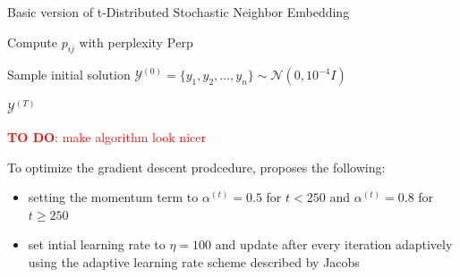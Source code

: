 \begin{algorithm}[H]
    \caption{Basic version of t-Distributed Stochastic Neighbor Embedding}
    \label{alg:tsne}


    Compute $p_{ij}$ with perplexity $\text{Perp}$ 
    
    Sample initial solution $\mathcal{Y}^{(0)} = \{y_1, y_2, \dots, y_n\} \sim \mathcal{N}(0, 10^{-4} I)$\


    \Return $\mathcal{Y}^{(T)}$\
\end{algorithm}
\textcolor{red}{\textbf{TO DO}: make algorithm look nicer}

To optimize the gradient descent prodcedure, \cite{vdMaa08} proposes the following: 
\begin{itemize}
    \item setting the momentum term to $\alpha^{(t)} = 0.5$ for $t<250$ and $\alpha^{(t)} = 0.8$ for $t \geq 250$
    \item set intial learning rate to $\eta = 100$ and update after every iteration adaptively using the adaptive learning rate scheme described by Jacobs \cite{Jacobs1988}
\end{itemize}


